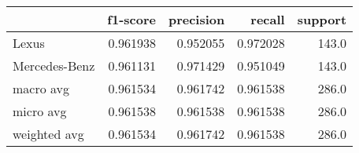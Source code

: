 \begin{tabular}{lrrrr}
\toprule
{} &  f1-score &  precision &    recall &  support \\
\midrule
Lexus         &  0.961938 &   0.952055 &  0.972028 &    143.0 \\
Mercedes-Benz &  0.961131 &   0.971429 &  0.951049 &    143.0 \\
macro avg     &  0.961534 &   0.961742 &  0.961538 &    286.0 \\
micro avg     &  0.961538 &   0.961538 &  0.961538 &    286.0 \\
weighted avg  &  0.961534 &   0.961742 &  0.961538 &    286.0 \\
\bottomrule
\end{tabular}

